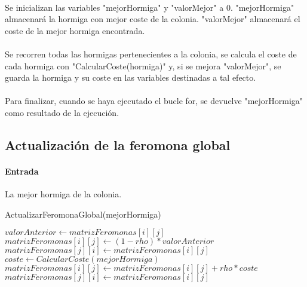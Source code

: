 	\paragraph{}Se inicializan las variables "mejorHormiga" y "valorMejor" a 0. "mejorHormiga" almacenará la hormiga con mejor coste de la colonia. "valorMejor" almacenará el coste de la mejor hormiga encontrada.
	
	\paragraph{}Se recorren todas las hormigas pertenecientes a la colonia, se calcula el coste de cada hormiga con "CalcularCoste(hormiga)" y, si se mejora "valorMejor", se guarda la hormiga y su coste en las variables destinadas a tal efecto.
	
	\paragraph{}Para finalizar, cuando se haya ejecutado el bucle for, se devuelve "mejorHormiga" como resultado de la ejecución.
	
	\subsection{Actualización de la feromona global}
	
	\paragraph{Entrada}La mejor hormiga de la colonia.
	
	\begin{algorithm}[H]
		\caption{ActualizarFeromonaGlobal(mejorHormiga)}
		\begin{algorithmic}
			\STATE$valorAnterior \leftarrow matrizFeromonas[i][j]$
			\STATE$matrizFeromonas[i][j] \leftarrow (1-rho)*valorAnterior$
			\STATE$matrizFeromonas[j][i] \leftarrow matrizFeromonas[i][j]$
			\ENDFOR
			\ENDFOR
			\STATE$coste \leftarrow CalcularCoste(mejorHormiga)$
			\STATE$matrizFeromonas[i][j]\leftarrow matrizFeromonas[i][j] + rho*coste$
			\STATE$matrizFeromonas[j][i] \leftarrow matrizFeromonas[i][j]$
			\ENDFOR
			\ENDFOR
		\end{algorithmic}
	\end{algorithm}

